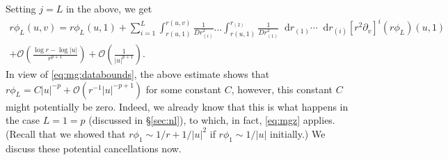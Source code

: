\documentclass[11pt,english]{article}
\numberwithin{equation}{section}
\theoremstyle{remark}
\theoremstyle{plain}
\theoremstyle{remark}
\newcommand{\dd}{\mathop{}\!\mathrm{d}}
\newcommand{\pv}{\partial_v}
\renewcommand{\(}{\left(}
\renewcommand{\)}{\right)}
\begin{document}
Setting $j=L$ in the above, we get
\begin{multline}\label{eq:mgz}
r\phi_L(u,v)=r\phi_L(u,1)+\sum_{i=1}^L 
\int_{r(u,1)}^{r(u,v)}\frac{1}{Dr_{(i)}^2}\dots\int_{r(u,1)}^{r_{(2)}}\frac{1}{Dr_{(1)}^2}\dd r_{(1)}\cdots\dd r_{(i)}[r^2\pv]^{i}(r\phi_L)(u,1)\\
+\mathcal O\left(\frac{\log r-\log |u|}{r^{p+1}}\right)+\mathcal{O}\left(\frac{1}{|u|^{p+1}}\right).
\end{multline}
In view of \eqref{eq:mg:databounds}, the above estimate shows that $r\phi_L=C|u|^{-p}+\mathcal O(r^{-1}|u|^{-p+1})$ for some constant $C$, however, this constant $C$ might potentially be zero. Indeed, we already know that this is what happens in the case $L=1=p$ (discussed in \S \ref{sec:nl}), to which, in fact,  \eqref{eq:mgz} applies. (Recall that we showed that $r\phi_1\sim 1/r+1/|u|^2$ if $r\phi_1\sim 1/|u|$ initially.) We discuss these potential cancellations now.
\end{document}
